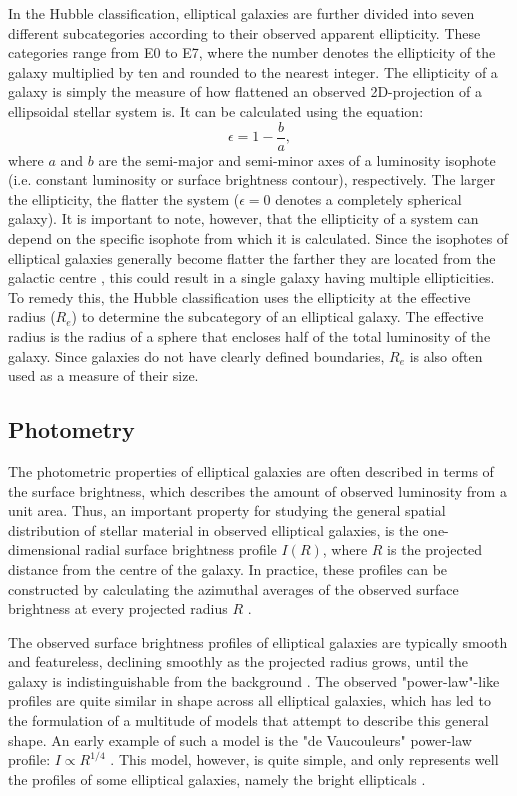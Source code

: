 \documentclass[english, twoside]{HYgradu}
\begin{document}
In the Hubble classification, elliptical galaxies are further divided into seven different subcategories according to their observed apparent ellipticity. These categories range from E0 to E7, where the number denotes the ellipticity of the galaxy multiplied by ten and rounded to the nearest integer. The ellipticity of a galaxy is simply the measure of how flattened an observed 2D-projection of a ellipsoidal stellar system is. It can be calculated using the equation:
\begin{equation}
\epsilon = 1 - \frac{b}{a}, \label{eq:ellipticity}
\end{equation}
where $a$ and $b$ are the semi-major and semi-minor axes of a luminosity isophote (i.e. constant luminosity or surface brightness contour), respectively. The larger the ellipticity, the flatter the system ($\epsilon = 0$ denotes a completely spherical galaxy). It is important to note, however, that the ellipticity of a system can depend on the specific isophote from which it is calculated. Since the isophotes of elliptical galaxies generally become flatter the farther they are located from the galactic centre \citep{BinneyTremaine}, this could result in a single galaxy having multiple ellipticities. To remedy this, the Hubble classification uses the ellipticity at the effective radius ($R_e$) to determine the subcategory of an elliptical galaxy. The effective radius is the radius of a sphere that encloses half of the total luminosity of the galaxy. Since galaxies do not have clearly defined boundaries, $R_e$ is also often used as a measure of their size. 

\subsection{Photometry} \label{section:ellip_photo}

The photometric properties of elliptical galaxies are often described in terms of the surface brightness, which describes the amount of observed luminosity from a unit area. Thus, an important property for studying the general spatial distribution of stellar material in observed elliptical galaxies, is the one-dimensional radial surface brightness profile $I(R)$, where $R$ is the projected distance from the centre of the galaxy. In practice, these profiles can be constructed by calculating the azimuthal averages of the observed surface brightness at every projected radius $R$ \citep{MerrittBook}.

The observed surface brightness profiles of elliptical galaxies are typically smooth and featureless, declining smoothly as the projected radius grows, until the galaxy is indistinguishable from the background \citep{BinneyTremaine}. The observed "power-law"-like profiles are quite similar in shape across all elliptical galaxies, which has led to the formulation of a multitude of models that attempt to describe this general shape. An early example of such a model is the "de Vaucouleurs" power-law profile: $I \propto R^{1/4}$ \citep{deVaucouleurs1948}. This model, however, is quite simple, and only represents well the profiles of some elliptical galaxies, namely the bright ellipticals \citep{MerrittBook}. 
\end{document}
